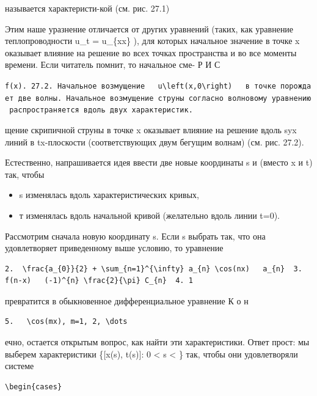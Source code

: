 \documentclass[
  ukrainian,
]{article}
\providecommand{\tightlist}{%
  \setlength{\itemsep}{0pt}\setlength{\parskip}{0pt}}
\begin{document}
называется характеристи-кой (см. рис. 27.1)

Этим наше уразнение отличается от других уравнений (таких, как уравнение
теплопроводности u\_t = u\_\{xx\} ), для которых начальное значение в
точке x оказывает влияние на решение во всех точках пространства и во
все моменты времени. Если читатель помнит, то начальное сме- Р И С

\texttt{f\textquotesingle{}\textquotesingle{}(x).\ 27.2.\ Начальное\ возмущение\ \ \ u\textbackslash{}left(x,0\textbackslash{}right)\ \ \ в\ точке\ порождает\ две\ волны.\ Начальное\ возмущение\ струны\ согласно\ волновому\ уравнению\ распространяется\ вдоль\ двух\ характеристик.}

щение скрипичной струны в точке x оказывает влияние на решение вдоль
\partial syx линий в tx-плоскости (соответствующих двум бегущим волнам)
(см. рис. 27.2).

Естественно, напрашивается идея ввести две новые координаты s и
\tau   (вместо x и t) так, чтобы

\begin{itemize}
\tightlist
\item
  s изменялась вдоль характеристических кривых,
\item
  т изменялась вдоль начальной кривой (желательно вдоль линии t=0).
\end{itemize}

Рассмотрим сначала новую координату s. Если s выбрать так, что она
удовлетворяет приведенному выше условию, то уравнение

\begin{verbatim}
2.  \frac{a_{0}}{2} + \sum_{n=1}^{\infty} a_{n} \cos(nx)   a_{n}  3.  f(n-x)   (-1)^{n} \frac{2}{\pi} C_{n}  4. 1
\end{verbatim}

превратится в обыкновенное дифференциальное уравнение К о н

\begin{verbatim}
5.   \cos(mx), m=1, 2, \dots
\end{verbatim}

ечно, остается открытым вопрос, как найти эти характеристики. Ответ
прост: мы выберем характеристики \{{[}x(s), t(s){]}: 0 \textless{} s
\textless{} \infty\} так, чтобы они удовлетворяли системе

\begin{verbatim}
\begin{cases}
\end{verbatim}
\end{document}
